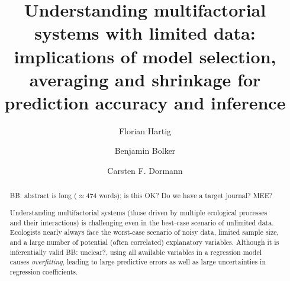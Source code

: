 \documentclass[5p]{elsarticle}
\newcommand{\bmb}[1]{{\color{blue} BB: #1}}
\begin{document}
\begin{frontmatter}



  \title{Understanding multifactorial systems with limited data:
    implications of model selection, averaging and shrinkage for prediction accuracy and inference
  }





\author[FR]{Florian Hartig}
\author[MM]{Benjamin Bolker}
\author[FR]{Carsten F. Dormann}

\address[FR]{University of Freiburg, Department of Biometry and Environmental System Analysis, Tennenbacherstrasse 4, 79106 Freiburg, Germany }

\address[MM]{McMaster University, Departments of Mathematics \& Statistics and Biology, 1280 Main St W, Hamilton ON Canada L8S 4K1}




\begin{abstract}

  \bmb{abstract is long ($\approx 474$ words); is this OK?  Do we have a target journal? MEE?}
  
  Understanding multifactorial systems (those driven by multiple ecological processes and their interactions) is challenging even in the best-case scenario of unlimited data. Ecologists nearly always face the worst-case scenario of noisy data, limited sample size, and a large number of potential (often correlated) explanatory variables. Although it is inferentially valid \bmb{unclear?}, using all available variables in a regression model causes \emph{overfitting}, leading to large predictive errors as well as large uncertainties in regression coefficients.


\end{abstract}
\end{frontmatter}
\end{document}
